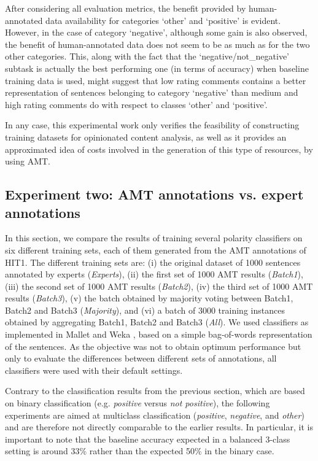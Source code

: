 \documentclass[11pt]{elsarticle}
\begin{document}
After considering all evaluation metrics, the benefit provided by human-annotated data
availability for categories `other' and `positive' is evident. However, in the case of category `negative', although some
gain is also observed, the benefit of human-annotated data does not seem to be as much as for the two other
categories. This, along with the fact that the `negative/not\_negative' subtask is actually the best performing
one (in terms of accuracy) when baseline training data is used, might suggest that low rating comments contains
a better representation of sentences belonging to category `negative' than medium and high rating comments do with
respect to classes `other' and `positive'.

In any case, this experimental work only verifies the feasibility of constructing training datasets for
opinionated content analysis, as well as it provides an approximated idea of costs involved in the generation
of this type of resources, by using AMT.

\subsection{Experiment two: AMT annotations vs. expert annotations}
\label{sect:eval2}

In this section, we compare the results of training several polarity classifiers on six different training sets, each of them generated from the AMT annotations of HIT1. The different training sets are: (i) the original dataset of 1000 sentences annotated by experts (\textit{Experts}), (ii) the first set of 1000 AMT results (\textit{Batch1}), (iii) the second set of 1000 AMT results (\textit{Batch2}), (iv) the third set of 1000 AMT results (\textit{Batch3}), (v) the batch obtained by majority voting between Batch1, Batch2 and Batch3 (\textit{Majority}), and (vi) a batch of 3000 training instances obtained by aggregating Batch1, Batch2 and Batch3 (\textit{All}). We used classifiers as implemented in Mallet \cite{mccallum} and Weka \cite{weka}, based on a simple bag-of-words representation of the sentences. As the objective was not to obtain optimum performance but only to evaluate the differences between different sets of annotations, all classifiers were used with their default settings.

Contrary to the classification results from the previous section, which are based on binary classification (e.g. \emph{positive} versus \emph{not positive}), the following experiments are aimed at multiclass classification (\emph{positive}, \emph{negative}, and \emph{other}) and are therefore not directly comparable to the earlier results. In particular, it is important to note that the baseline accuracy expected in a balanced 3-class setting is around 33\% rather than the expected 50\% in the binary case.
\end{document}
